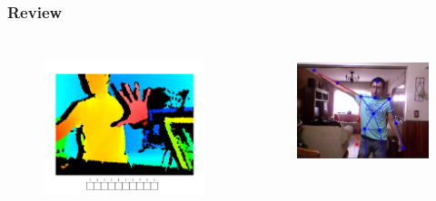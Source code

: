 \documentclass{beamer}
\begin{document}
\begin{frame}
\frametitle{Review}
\begin{columns}[c] %

\begin{figure}
\centering
        \includegraphics[totalheight=4.7cm]{kinect_array.png}
    \label{fig:verticalcell}
    \end{figure}

\begin{figure}
\centering
        \includegraphics[totalheight=3.6cm]{comp2.png}
    \label{fig:verticalcell}
    \end{figure}

\end{columns}
\end{frame}
\end{document}
